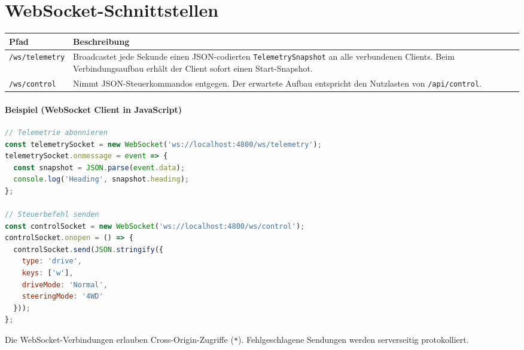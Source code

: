 \documentclass[a4paper,11pt]{article}
\begin{document}
\section{WebSocket-Schnittstellen}
\begin{longtable}{p{4cm}p{9cm}}
\textbf{Pfad} & \textbf{Beschreibung}\\\hline
\texttt{/ws/telemetry} & Broadcastet jede Sekunde einen JSON-codierten \texttt{TelemetrySnapshot} an alle verbundenen Clients. Beim Verbindungsaufbau erhält der Client sofort einen Start-Snapshot.\\
\texttt{/ws/control} & Nimmt JSON-Steuerkommandos entgegen. Der erwartete Aufbau entspricht den Nutzlasten von \texttt{/api/control}.\\
\end{longtable}

\paragraph{Beispiel (WebSocket Client in JavaScript)}
\begin{lstlisting}[language=JavaScript]
// Telemetrie abonnieren
const telemetrySocket = new WebSocket('ws://localhost:4800/ws/telemetry');
telemetrySocket.onmessage = event => {
  const snapshot = JSON.parse(event.data);
  console.log('Heading', snapshot.heading);
};

// Steuerbefehl senden
const controlSocket = new WebSocket('ws://localhost:4800/ws/control');
controlSocket.onopen = () => {
  controlSocket.send(JSON.stringify({
    type: 'drive',
    keys: ['w'],
    driveMode: 'Normal',
    steeringMode: '4WD'
  }));
};
\end{lstlisting}

Die WebSocket-Verbindungen erlauben Cross-Origin-Zugriffe (\texttt{*}). Fehlgeschlagene Sendungen werden serverseitig protokolliert.
\end{document}
